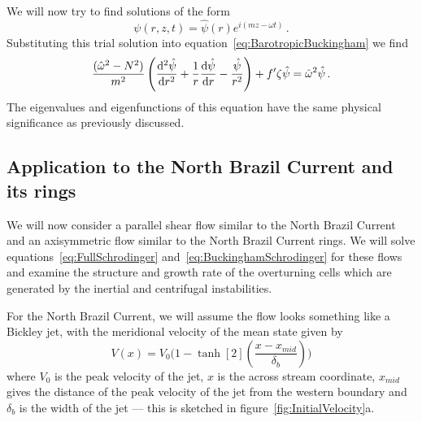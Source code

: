 We will now try to find solutions of the form
\begin{equation}
    \psi(r, z, t) = \hat{\psi}(r) e^{i(mz - \omega t)} \, .
\end{equation}
Substituting this trial solution into equation~\ref{eq:BarotropicBuckingham} we find
\begin{equation}
    \frac{(\hat{\omega}^2 - N^2 )}{m^2}\, \Bigg(\dv[2]{\hat{\psi}}{r} + \frac{1}{r} \dv{\hat{\psi}}{r} - \frac{\hat{\psi}}{r^2}\Bigg) + f' \zeta \hat{\psi} = \hat{\omega}^2 \hat{\psi}\, .
    \label{eq:BuckinghamSchrodinger}
\end{equation}
The eigenvalues and eigenfunctions of this equation have the same physical significance as previously discussed.

\subsection{Application to the North Brazil Current and its rings}
\label{subsec:NBClsa}
We will now consider a parallel shear flow similar to the North Brazil Current and an axisymmetric flow similar to the North Brazil Current rings. We will solve equations~\ref{eq:FullSchrodinger} and~\ref{eq:BuckinghamSchrodinger} for these flows and examine the structure and growth rate of the overturning cells which are generated by the inertial and centrifugal instabilities.

For the North Brazil Current, we will assume the flow looks something like a Bickley jet, with the meridional velocity of the mean state given by
\begin{equation}
    V(x) = V_0 \Bigg( 1 - \tanh[2](\frac{x - x_{mid}}{\delta_b})\Bigg)
\end{equation}
where $V_0$ is the peak velocity of the jet, $x$ is the across stream coordinate, $x_{mid}$ gives the distance of the peak velocity of the jet from the western boundary and $\delta_b$ is the width of the jet --- this is sketched in figure~\ref{fig:InitialVelocity}a.

